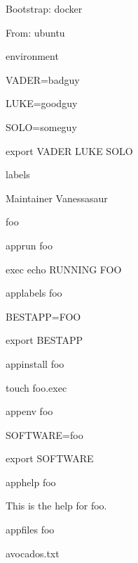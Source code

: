 \documentclass[letterpaper,10pt,english]{sphinxmanual}
\begin{document}
%
\begin{sphinxVerbatim}[commandchars=\\\{\}]
Bootstrap: docker

From: ubuntu


\PYGZpc{}environment

    VADER=badguy

    LUKE=goodguy

    SOLO=someguy

    export VADER LUKE SOLO


\PYGZpc{}labels

   Maintainer Vanessasaur


\PYGZsh{}\PYGZsh{}\PYGZsh{}\PYGZsh{}\PYGZsh{}\PYGZsh{}\PYGZsh{}\PYGZsh{}\PYGZsh{}\PYGZsh{}\PYGZsh{}\PYGZsh{}\PYGZsh{}\PYGZsh{}\PYGZsh{}\PYGZsh{}\PYGZsh{}\PYGZsh{}\PYGZsh{}\PYGZsh{}\PYGZsh{}\PYGZsh{}\PYGZsh{}\PYGZsh{}\PYGZsh{}\PYGZsh{}\PYGZsh{}\PYGZsh{}\PYGZsh{}\PYGZsh{}

\PYGZsh{} foo

\PYGZsh{}\PYGZsh{}\PYGZsh{}\PYGZsh{}\PYGZsh{}\PYGZsh{}\PYGZsh{}\PYGZsh{}\PYGZsh{}\PYGZsh{}\PYGZsh{}\PYGZsh{}\PYGZsh{}\PYGZsh{}\PYGZsh{}\PYGZsh{}\PYGZsh{}\PYGZsh{}\PYGZsh{}\PYGZsh{}\PYGZsh{}\PYGZsh{}\PYGZsh{}\PYGZsh{}\PYGZsh{}\PYGZsh{}\PYGZsh{}\PYGZsh{}\PYGZsh{}\PYGZsh{}


\PYGZpc{}apprun foo

    exec echo \PYGZdq{}RUNNING FOO\PYGZdq{}


\PYGZpc{}applabels foo

   BESTAPP=FOO

   export BESTAPP


\PYGZpc{}appinstall foo

   touch foo.exec


\PYGZpc{}appenv foo

    SOFTWARE=foo

    export SOFTWARE


\PYGZpc{}apphelp foo

    This is the help for foo.


\PYGZpc{}appfiles foo

   avocados.txt



\PYGZsh{}\PYGZsh{}\PYGZsh{}\PYGZsh{}\PYGZsh{}\PYGZsh{}\PYGZsh{}\PYGZsh{}\PYGZsh{}\PYGZsh{}\PYGZsh{}\PYGZsh{}\PYGZsh{}\PYGZsh{}\PYGZsh{}\PYGZsh{}\PYGZsh{}\PYGZsh{}\PYGZsh{}\PYGZsh{}\PYGZsh{}\PYGZsh{}\PYGZsh{}\PYGZsh{}\PYGZsh{}\PYGZsh{}\PYGZsh{}\PYGZsh{}\PYGZsh{}\PYGZsh{}


\end{sphinxVerbatim}
\end{document}
